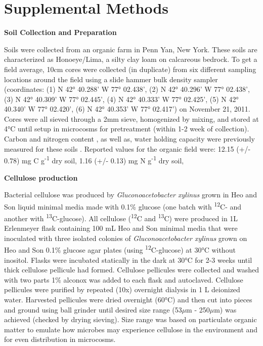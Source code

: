 \section{Supplemental Methods}


\textbf{Soil Collection and Preparation}



Soils were collected from an organic farm in Penn Yan, New York.  These soils are characterized as Honoeye/Lima, a silty clay loam on calcareous bedrock. To get a field average, 10cm cores were collected (in duplicate) from six different sampling locations around the field using a slide hammer bulk density sampler (coordinates: (1) N 42° 40.288’ W 77° 02.438’, (2) N 42° 40.296’ W 77° 02.438’, (3) N 42° 40.309’ W 77° 02.445’, (4) N 42° 40.333’ W 77° 02.425’, (5) N 42° 40.340’ W 77° 02.420’, (6) N 42° 40.353’ W 77° 02.417’) on November 21, 2011.   Cores were all sieved through a 2mm sieve, homogenized by mixing, and stored at 4°C until setup in microcosms for pretreatment (within 1-2 week of collection).  Carbon and nitrogen content , as well as, water holding capacity were previously measured for these soils \cite{Berthrong_2013}. Reported values for the organic field were: 12.15 (+/- 0.78) mg C g\textsuperscript{-1} dry soil, 1.16 (+/- 0.13) mg N g\textsuperscript{-1} dry soil,



\textbf{Cellulose production}



Bacterial cellulose was produced by \textit{Gluconoacetobacter xylinus} grown in Heo and Son \cite{Heo_2002} liquid minimal media made with 0.1\% glucose (one batch with \textsuperscript{12}C- and another with \textsuperscript{13}C-glucose). All cellulose (\textsuperscript{12}C and \textsuperscript{13}C) were produced in 1L Erlenmeyer flask containing 100 mL Heo and Son minimal media that were inoculated with three isolated colonies of \textit{Gluconoacetobacter xylinus} grown on Heo and Son 0.1\% glucose agar plates (using \textsuperscript{12}C-glucose) at 30°C without inositol. Flasks were incubated statically in the dark at 30°C for 2-3 weeks until thick cellulose pellicule had formed.  Cellulose pellicules were collected and washed with two parts 1\% alconox was added to each flask and autoclaved. Cellulose pellicules were purified by repeated (10x) overnight dialysis in 1 L deionized water. Harvested pellicules were dried overnight (60°C) and then cut into pieces and ground using ball grinder until desired size range (53$\mu$m - 250$\mu$m) was achieved (checked by drying sieving). Size range was based on particulate organic matter to emulate how microbes may experience cellulose in the environment \cite{Cambardella_1992} and for even distribution in microcosms. 

